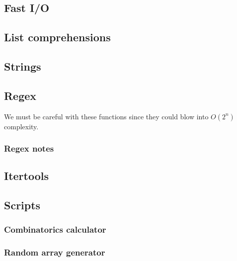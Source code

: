 \documentclass[10pt,letterpaper,landscape,twocolumn]{article}
\begin{document}
\subsection{Fast I/O}



\subsection{List comprehensions}


\subsection{Strings}



\subsection{Regex}

We must be careful with these functions since they could blow into $O(2^n)$ complexity.


\subsubsection{Regex notes}


\subsection{Itertools}


\subsection{Scripts}

\subsubsection{Combinatorics calculator}



\subsubsection{Random array generator}
\end{document}

